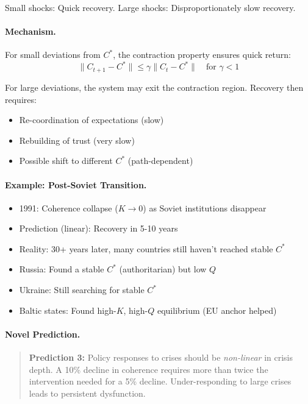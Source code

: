 Small shocks: Quick recovery.
Large shocks: Disproportionately slow recovery.

\paragraph{Mechanism.}
For small deviations from $C^*$, the contraction property ensures quick return:
\begin{equation}
  \|C_{t+1} - C^*\| \leq \gamma \|C_t - C^*\| \quad \text{for } \gamma < 1
\end{equation}

For large deviations, the system may exit the contraction region.
Recovery then requires:
\begin{itemize}
  \item Re-coordination of expectations (slow)
  \item Rebuilding of trust (very slow)
  \item Possible shift to different $C^*$ (path-dependent)
\end{itemize}

\paragraph{Example: Post-Soviet Transition.}
\begin{itemize}
  \item 1991: Coherence collapse ($K \to 0$) as Soviet institutions disappear
  \item Prediction (linear): Recovery in 5-10 years
  \item Reality: 30+ years later, many countries still haven't reached stable $C^*$
  \item Russia: Found a stable $C^*$ (authoritarian) but low $Q$
  \item Ukraine: Still searching for stable $C^*$
  \item Baltic states: Found high-$K$, high-$Q$ equilibrium (EU anchor helped)
\end{itemize}

\paragraph{Novel Prediction.}
\begin{quote}
\textbf{Prediction 3:} Policy responses to crises should be
\emph{non-linear} in crisis depth. A 10\% decline in coherence
requires more than twice the intervention needed for a 5\% decline.
Under-responding to large crises leads to persistent dysfunction.
\end{quote}

